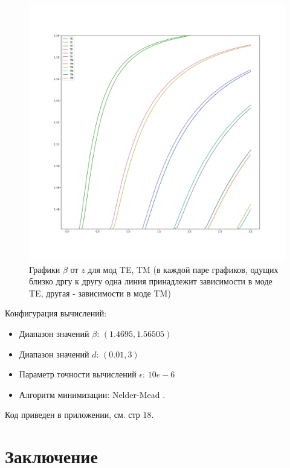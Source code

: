 \documentclass{article}
\begin{document}
\begin{figure}[H]
    \centering
    \includegraphics[width=\linewidth]{final.png}
    \caption{Графики $\beta$ от $z$ для мод TE, TM (в каждой паре графиков, одущих близко дргу к другу одна линия принадлежит зависимости в моде TE, другая - зависимости в моде TM)}
    \label{beta_d}
\end{figure}

Конфигурация вычислений:
\begin{itemize}
    \item Диапазон значений $\beta$: $(1.4695, 1.56505)$
    \item Диапазон значений $d$: $(0.01, 3)$
    \item Параметр точности вычислений $\epsilon$: $10e-6$
    \item Алгоритм минимизации: Nelder-Mead \cite{nelder1965simplex}.
\end{itemize}

Код приведен в приложении, см. стр 18.

\newpage

\section{Заключение}
\end{document}
